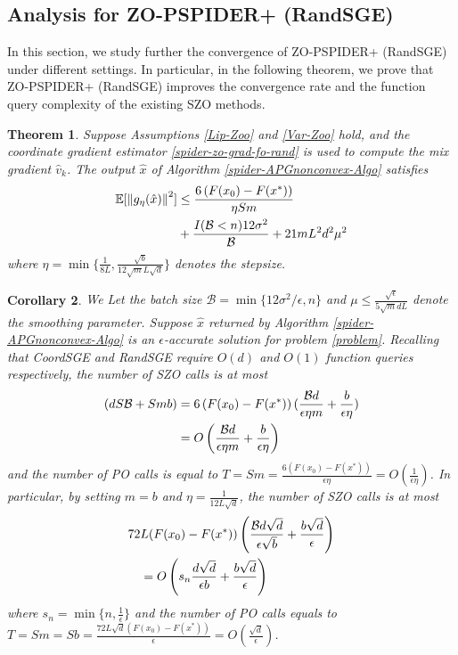 \documentclass[iicol,sn-basic]{sn-jnl}
\theoremstyle{thmstyleone}%
\newtheorem{theorem}{Theorem}%
\theoremstyle{thmstyletwo}%
\theoremstyle{thmstylethree}%
\newcommand*{\E}{\mathbb{E}}
\newcommand{\norm}[1]{\left\lVert#1\right\rVert}
\newtheorem{corollary}[theorem]{Corollary}
\begin{document}
\subsection{Analysis for ZO-PSPIDER+ (RandSGE)}
In this section, we study further the convergence of ZO-PSPIDER+ (RandSGE) under different settings. In particular, in the following theorem, we prove that ZO-PSPIDER+ (RandSGE) improves the convergence rate and the function query complexity of the existing SZO methods.
\begin{theorem}\label{spider-noncon-zoo-rand}
Suppose Assumptions \ref{Lip-Zoo} and \ref{Var-Zoo} hold, and the coordinate gradient estimator \eqref{spider-zo-grad-fo-rand} is used to compute the mix gradient $\hat{v}_k$. The output $\hat{x}$ of Algorithm \ref{spider-APGnonconvex-Algo} satisfies
\begin{align}
\E[\norm{g_{\eta}(\hat{x})}^2] & \leq \frac{6\left(F(x_0) - F({x}^*)\right)}{\eta Sm}\notag\\
& + \frac{I(\mathcal{B} < n)12\sigma ^2}{\mathcal{B}}+21{m L^2 d^2 \mu^2}\notag
\end{align}
where $\eta = \min\{\frac{1}{8L}, \frac{\sqrt{b}}{12 \sqrt{m}L\sqrt{d}}\}$ denotes the stepsize.
\end{theorem}


\begin{corollary}\label{spider-corr11-rand}
We Let the batch size $\mathcal{B} = \min\{12\sigma^2/\epsilon, n\}$ and $\mu \leq \frac{\sqrt{\epsilon}}{5{\sqrt{m}dL}}$ denote the smoothing parameter. Suppose $\hat{x}$ returned by Algorithm \ref{spider-APGnonconvex-Algo} is an $\epsilon$-accurate solution for problem \eqref{problem}. Recalling that CoordSGE and RandSGE require $O(d)$ and $O(1)$ function queries respectively, the number of SZO calls is at most 
\begin{align}
(dS\mathcal{B}+Smb) & = 6 \left(F(x_0) - F({x}^*)\right) (\frac{\mathcal{B}d}{\epsilon\eta m}+\frac{b}{\epsilon\eta})\notag\\
& = O\left(\frac{\mathcal{B}d}{\epsilon\eta m}+\frac{b}{\epsilon\eta}\right)\label{spider-SZO-call-nocon-rand}
\end{align} 
and the number of PO calls is equal to $T = Sm = \frac{6\left(F(x_0) - F({x}^*)\right)}{\epsilon\eta} = O\left(\frac{1}{\epsilon\eta}\right)$. In particular, by setting $m= b$ and $\eta = \frac{1}{12L\sqrt{d}}$, the number of SZO calls is at most 
\begin{align}
72 &L (F(x_0)-F(x^*))\left(\frac{\mathcal{B}d\sqrt{d}}{\epsilon\sqrt{b}}+\frac{b\sqrt{d}}{\epsilon}\right)\notag\\
& = O\left(s_n\frac{d\sqrt{d}}{\epsilon b}+\frac{b\sqrt{d}}{\epsilon}\right)\label{spider-SZO-call-par-nocon-rand}
\end{align}
where $s_n = \min\{n,\frac{1}{\epsilon}\}$ and the number of PO calls equals to $T = Sm = S b = \frac{72 L \sqrt{d}\left(F(x_0) - F({x}^*)\right)}{\epsilon} = O\left(\frac{\sqrt{d}}{\epsilon}\right)$. 
\end{corollary}
\end{document}

